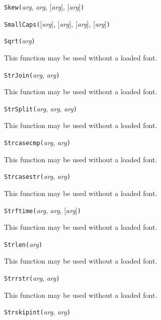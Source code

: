
\noindent\texttt{Skew(}\textit{arg}, \textit{arg}, [\textit{arg}], [\textit{arg}]\texttt{)}


\noindent\texttt{SmallCaps(}[\textit{arg}], [\textit{arg}], [\textit{arg}], [\textit{arg}]\texttt{)}


\noindent\texttt{Sqrt(}\textit{arg}\texttt{)}

This function may be used without a loaded font.


\noindent\texttt{StrJoin(}\textit{arg}, \textit{arg}\texttt{)}

This function may be used without a loaded font.


\noindent\texttt{StrSplit(}\textit{arg}, \textit{arg}, \textit{arg}\texttt{)}

This function may be used without a loaded font.


\noindent\texttt{Strcasecmp(}\textit{arg}, \textit{arg}\texttt{)}

This function may be used without a loaded font.


\noindent\texttt{Strcasestr(}\textit{arg}, \textit{arg}\texttt{)}

This function may be used without a loaded font.


\noindent\texttt{Strftime(}\textit{arg}, \textit{arg}, [\textit{arg}]\texttt{)}

This function may be used without a loaded font.


\noindent\texttt{Strlen(}\textit{arg}\texttt{)}

This function may be used without a loaded font.


\noindent\texttt{Strrstr(}\textit{arg}, \textit{arg}\texttt{)}

This function may be used without a loaded font.


\noindent\texttt{Strskipint(}\textit{arg}, \textit{arg}\texttt{)}

